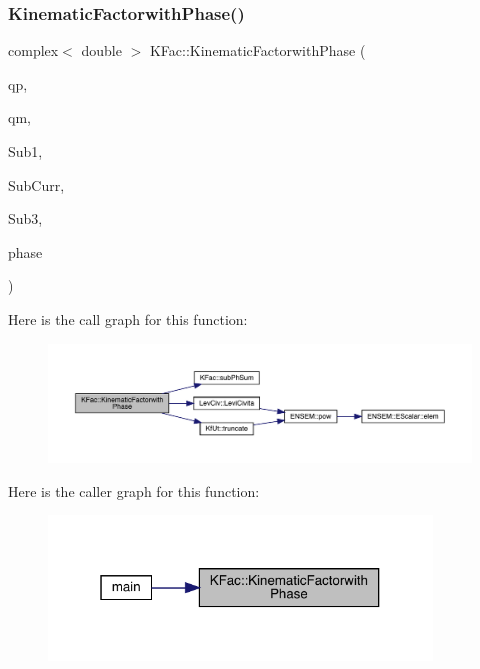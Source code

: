 \subsubsection{\texorpdfstring{KinematicFactorwithPhase()}{KinematicFactorwithPhase()}\hspace{0.1cm}{\footnotesize\ttfamily [2/2]}}
{\footnotesize\ttfamily complex$<$ double $>$ K\+Fac\+::\+Kinematic\+Factorwith\+Phase (\begin{DoxyParamCaption}\item[{Eigen\+::\+Vector\+Xd \&}]{qp,  }\item[{Eigen\+::\+Vector\+Xd \&}]{qm,  }\item[{map$<$ int, Eigen\+::\+Matrix\+Xcd $>$ \&}]{Sub1,  }\item[{map$<$ int, Eigen\+::\+Matrix\+Xcd $>$ \&}]{Sub\+Curr,  }\item[{map$<$ int, Eigen\+::\+Matrix\+Xcd $>$ \&}]{Sub3,  }\item[{\mbox{\hyperlink{structPh_1_1phChars}{Ph\+::ph\+Chars}} \&}]{phase }\end{DoxyParamCaption})}

Here is the call graph for this function\+:
\nopagebreak
\begin{figure}[H]
\begin{center}
\leavevmode
\includegraphics[width=350pt]{d2/d89/namespaceKFac_ac10b1bd8db1661c292e327a3eabcebb9_cgraph}
\end{center}
\end{figure}
Here is the caller graph for this function\+:
\nopagebreak
\begin{figure}[H]
\begin{center}
\leavevmode
\includegraphics[width=289pt]{d2/d89/namespaceKFac_ac10b1bd8db1661c292e327a3eabcebb9_icgraph}
\end{center}
\end{figure}
\mbox{\label{namespaceKFac_a8a20f176fbf91758f8699734b8df3f04}} 
